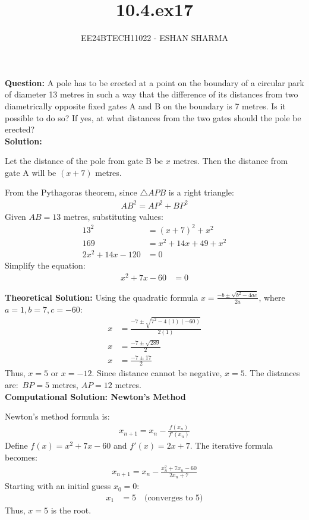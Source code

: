 \documentclass[journal]{IEEEtran}
\begin{document}
	
	\title{10.4.ex17}
	\author{EE24BTECH11022 - ESHAN SHARMA}
	\maketitle
	
	\textbf{Question:}
	A pole has to be erected at a point on the boundary of a circular park of diameter 13 metres in such a way that the difference of its distances from two diametrically opposite fixed gates A and B on the boundary is 7 metres. Is it possible to do so? If yes, at what distances from the two gates should the pole be erected?\\
	
	\textbf{Solution:}
	
	Let the distance of the pole from gate B be \(x\) metres. Then the distance from gate A will be \((x+7)\) metres.
	
	From the Pythagoras theorem, since \(\triangle APB\) is a right triangle:
	\begin{align}
		AB^2 = AP^2 + BP^2
	\end{align}
	Given \(AB = 13\) metres, substituting values:
	\begin{align}
		13^2 &= (x+7)^2 + x^2 \\
		169 &= x^2 + 14x + 49 + x^2 \\
		2x^2 + 14x - 120 &= 0
	\end{align}
	Simplify the equation:
	\begin{align}
		x^2 + 7x - 60 &= 0
	\end{align}
	
	\textbf{Theoretical Solution:}
	Using the quadratic formula \(x = \frac{-b \pm \sqrt{b^2 - 4ac}}{2a}\), where \(a = 1, b = 7, c = -60\):
	\begin{align}
		x &= \frac{-7 \pm \sqrt{7^2 - 4(1)(-60)}}{2(1)} \\
		x &= \frac{-7 \pm \sqrt{289}}{2} \\
		x &= \frac{-7 \pm 17}{2}
	\end{align}
	Thus, \(x = 5\) or \(x = -12\). Since distance cannot be negative, \(x = 5\).
	The distances are:\
	\(BP = 5\) metres, \(AP = 12\) metres.\\
	
	\textbf{Computational Solution: Newton's Method}
	
	Newton's method formula is:
	\begin{align}
		x_{n+1} = x_n - \frac{f(x_n)}{f'(x_n)}
	\end{align}
	Define \(f(x) = x^2 + 7x - 60\) and \(f'(x) = 2x + 7\). The iterative formula becomes:
	\begin{align}
		x_{n+1} = x_n - \frac{x_n^2 + 7x_n - 60}{2x_n + 7}
	\end{align}
	Starting with an initial guess \(x_0 = 0\):
	\begin{align}
		x_1 &= 5 \quad \text{(converges to 5)}
	\end{align}
	Thus, \(x = 5\) is the root.\\
	
\end{document}

